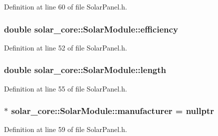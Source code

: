 Definition at line 60 of file Solar\+Panel.\+h.

\hypertarget{classsolar__core_1_1_solar_module_a0303a0da750be23a4a408645d838ed24}{}
\subsubsection[{efficiency}]{\setlength{\rightskip}{0pt plus 5cm}double solar\+\_\+core\+::\+Solar\+Module\+::efficiency}\label{classsolar__core_1_1_solar_module_a0303a0da750be23a4a408645d838ed24}


Definition at line 52 of file Solar\+Panel.\+h.

\hypertarget{classsolar__core_1_1_solar_module_a34cc7ce18770e51c87a3655f6f481be0}{}
\subsubsection[{length}]{\setlength{\rightskip}{0pt plus 5cm}double solar\+\_\+core\+::\+Solar\+Module\+::length}\label{classsolar__core_1_1_solar_module_a34cc7ce18770e51c87a3655f6f481be0}


Definition at line 55 of file Solar\+Panel.\+h.

\hypertarget{classsolar__core_1_1_solar_module_a32c10820046565c531a3e1a0fd8107b0}{}
\subsubsection[{manufacturer}]{$\ast$ solar\+\_\+core\+::\+Solar\+Module\+::manufacturer = nullptr}\label{classsolar__core_1_1_solar_module_a32c10820046565c531a3e1a0fd8107b0}


Definition at line 59 of file Solar\+Panel.\+h.

\hypertarget{classsolar__core_1_1_solar_module_a24c71dfff1a0503fe967d11c52be05b8}{}
